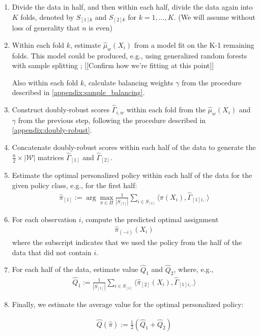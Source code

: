 \documentclass[letterpaper, 12pt, parskip=full, headsepline]{scrartcl}
\begin{document}
\begin{enumerate}
%
  \item Divide the data in half, and then within each half, divide the data again into $K$ folds, denoted by $S_{[1]k}$ and $S_{[2]k}$ for $k = 1, \dots, K$. (We will assume without loss of generality that $n$ is even)
  \item Within each fold $k$, estimate $\hat{\mu}_{w}(X_{i})$ from a model fit on the K-1 remaining folds. This model could be produced, e.g., using generalized random forests with sample splitting \citep{athey2016generalized}; {\color{red}[[Confirm how we're fitting at this point]]} 
  
  Also within each fold $k$, calculate balancing weights $\gamma$ from the procedure described in \ref{appendix:sample_balancing}. 
  
  \item Construct doubly-robust scores $\hat{\Gamma}_{i,w}$ within each fold from the $\hat{\mu}_{w}(X_{i})$ and $\gamma$ from the previous step, following the procedure described in \ref{appendix:doubly-robust}.  
  
  \item Concatenate doubly-robust scores within each half of the data to generate the $\frac n 2 \times |\mathcal{W}|$ matrices $\hat{\Gamma}_{[1]}$ and $\hat{\Gamma}_{[2]}$. 
  
  \item Estimate the optimal personalized policy within each half of the data for the given policy class, e.g., for the first half:
  \begin{align}
      \hat{\pi}_{[1]} := \arg\max_{\pi \in \Pi} \frac{1}{|S_{[1]}|} \sum_{i \in S_{[1]}} \langle \pi(X_{i}), \hat{\Gamma}_{[1]i,\cdot} \rangle
  \end{align}

  \item For each observation $i$, compute the predicted optimal assignment
      \begin{align}
       \hat{\pi}_{(-i)}(X_{i})
      \end{align}
  \noindent where the subscript indicates that we used the policy from the half of the data that did not contain $i$.
 
 \item For each half of the data, estimate {\color{red}value} $\widehat{Q}_1$ and $\widehat{Q}_2$, where, e.g., 
  \begin{align}
     \widehat{Q}_{1} := \frac{1}{|S_{[1]}|} \sum_{i \in S_{[1]}} \langle \hat{\pi}_{[2]}(X_{i}), \hat{\Gamma}_{[1]i,\cdot} \rangle
  \end{align}

\item Finally, we estimate the average value for the optimal personalized policy:

  {\color{red}
  \begin{align}
     \widehat{Q}(\widehat{\pi}) := \frac{1}{2} \left(   \widehat{Q}_{1} +   \widehat{Q}_{2}\right)
  \end{align}}

\end{enumerate}
\end{document}
